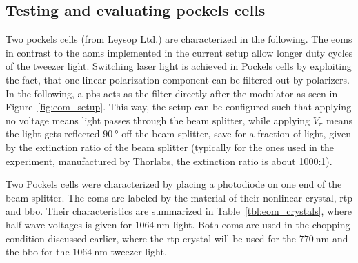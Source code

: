 \begin{figure}[tbp]%
\end{figure}

\subsection{Testing and evaluating pockels cells}

Two pockels cells (from Leysop Ltd.) are characterized in the following. The \acp{eom} in contrast to the \acp{aom} implemented in the current setup allow longer duty cycles of the tweezer light. Switching laser light is achieved in Pockels cells by exploiting the fact, that one linear polarization component can be filtered out by polarizers. In the following, a \ac{pbs} acts as the filter directly after the modulator as seen in Figure~\ref{fig:eom_setup}. This way, the setup can be configured such that applying no voltage means light passes through the beam splitter, while applying $V_\pi$ means the light gets reflected $\SI{90}{\degree}$ off the beam splitter, save for a fraction of light, given by the extinction ratio of the beam splitter (typically for the ones used in the experiment, manufactured by Thorlabs, the extinction ratio is about 1000:1).

\begin{figure}[tbp]%
\end{figure}

Two  Pockels cells were characterized by placing a photodiode on one end of the beam splitter. The \acp{eom} are labeled by the material of their nonlinear crystal, \ac{rtp} and \ac{bbo}. Their characteristics are summarized in Table~\ref{tbl:eom_crystals}, where half wave voltages is given for $\SI{1064}{\nano\meter}$ light. Both \acp{eom} are used in the chopping condition discussed earlier, where the \ac{rtp} crystal will be used for the $\SI{770}{\nano\meter}$ and the \ac{bbo} for the $\SI{1064}{\nano\meter}$ tweezer light.


